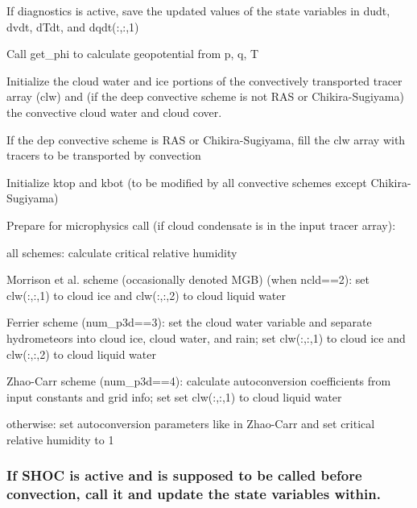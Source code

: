 \begin{DoxyItemize}
\item If diagnostics is active, save the updated values of the state variables in \textquotesingle{}dudt\textquotesingle{}, \textquotesingle{}dvdt\textquotesingle{}, \textquotesingle{}d\+Tdt\textquotesingle{}, and \textquotesingle{}dqdt(\+:,\+:,1)\textquotesingle{}
\item Call \textquotesingle{}get\+\_\+phi\textquotesingle{} to calculate geopotential from p, q, T
\item Initialize the cloud water and ice portions of the convectively transported tracer array (clw) and (if the deep convective scheme is not R\+AS or Chikira-\/\+Sugiyama) the convective cloud water and cloud cover.
\item If the dep convective scheme is R\+AS or Chikira-\/\+Sugiyama, fill the \textquotesingle{}clw\textquotesingle{} array with tracers to be transported by convection
\item Initialize \textquotesingle{}ktop\textquotesingle{} and \textquotesingle{}kbot\textquotesingle{} (to be modified by all convective schemes except Chikira-\/\+Sugiyama)
\item Prepare for microphysics call (if cloud condensate is in the input tracer array)\+:
\begin{DoxyItemize}
\item all schemes\+: calculate critical relative humidity
\item Morrison et al. scheme (occasionally denoted M\+GB) (when ncld==2)\+: set clw(\+:,\+:,1) to cloud ice and clw(\+:,\+:,2) to cloud liquid water
\item Ferrier scheme (num\+\_\+p3d==3)\+: set the cloud water variable and separate hydrometeors into cloud ice, cloud water, and rain; set clw(\+:,\+:,1) to cloud ice and clw(\+:,\+:,2) to cloud liquid water
\item Zhao-\/\+Carr scheme (num\+\_\+p3d==4)\+: calculate autoconversion coefficients from input constants and grid info; set set clw(\+:,\+:,1) to cloud liquid water
\item otherwise\+: set autoconversion parameters like in Zhao-\/\+Carr and set critical relative humidity to 1
\end{DoxyItemize}
\end{DoxyItemize}\subsubsection*{If S\+H\+OC is active and is supposed to be called before convection, call it and update the state variables within.}


